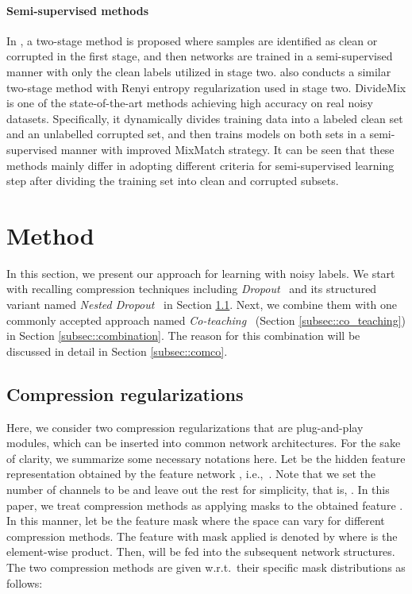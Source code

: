 \documentclass[journal]{IEEEtran}
\begin{document}
\paragraph{Semi-supervised methods}
In \cite{ding2018semi}, a two-stage method is proposed where samples are identified as clean or corrupted in the first stage, and then networks are trained in a semi-supervised manner with only the clean labels utilized in stage two.
\cite{kong2019recycling} also conducts a similar two-stage method with Renyi entropy regularization used in stage two.
DivideMix \cite{li2020dividemix} is one of the state-of-the-art methods achieving high accuracy on real noisy datasets.
Specifically, it dynamically divides training data into a labeled clean set and an unlabelled corrupted set, and then trains models on both sets in a semi-supervised manner with improved MixMatch \cite{berthelot2019mixmatch} strategy.
It can be seen that these methods mainly differ in adopting different criteria for semi-supervised learning step after dividing the training set into clean and corrupted subsets.


\section{Method} \label{sec::method}
In this section, we present our approach for learning with noisy labels. 
We start with recalling compression techniques including \textit{Dropout}~\cite{srivastava2014dropout} and its structured variant named \textit{Nested Dropout}~\cite{rippel2014learning} in Section \ref{subsec::nested}.
Next, we combine them with one commonly accepted approach named \textit{Co-teaching}~\cite{han2018co} 
(Section \ref{subsec::co_teaching}) in Section \ref{subsec::combination}.
The reason for this combination will be discussed in detail in Section \ref{subsec::comco}.


\subsection{Compression regularizations} \label{subsec::nested}
Here, we consider two compression regularizations that are plug-and-play modules, which can be inserted into common network architectures.
For the sake of clarity, we summarize some necessary notations here.
Let  be the hidden feature representation obtained by the feature network , i.e.,~.
Note that we set the number of channels to be  and leave out the rest for simplicity, that is, . 
In this paper, we treat compression methods as applying masks to the obtained feature . 
In this manner, let  be the feature mask where the space  can vary for different compression methods.
The feature with mask applied is denoted by  where  is the element-wise product.
Then,  will be fed into the subsequent network structures.
The two compression methods are given w.r.t.~their specific mask distributions as follows:
 
\end{document}
